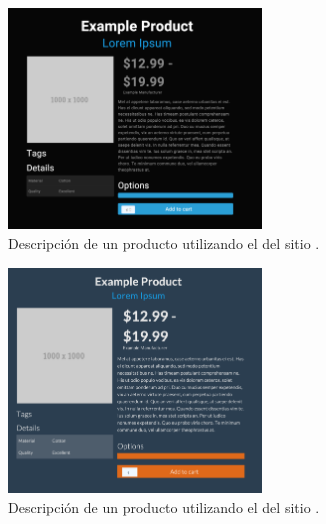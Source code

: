 \begin{figure}[H]
	\centering
	\includegraphics[width=0.6\textwidth]{figuras/bootstrap/bootstrap_theme_cyborg.png}

	\caption{Descripción de un producto utilizando el \themeCPT \textbf{\themeCyborg} del sitio \bootswatchNAME.}
	\label{figure:bootstrap:theme_cyborg}
\end{figure}


\begin{figure}[H]
	\centering
	\includegraphics[width=0.6\textwidth]{figuras/bootstrap/bootstrap_theme_superhero.png}

	\caption{Descripción de un producto utilizando el \themeCPT \textbf{\themeSuperHero} del sitio \bootswatchNAME.}
	\label{figure:bootstrap:theme_superhero}
\end{figure}


